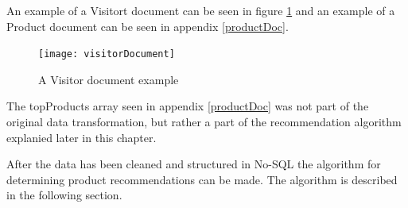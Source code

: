 An example of a Visitort document can be seen in figure \ref{visitorDoc} and an example of a Product document can be seen in appendix \ref{productDoc}.
\begin{figure}[H]
	\centering
	\texttt{[image: visitorDocument]}
	\caption{A Visitor document example}
	\label{visitorDoc}
\end{figure}

The topProducts array seen in appendix \ref{productDoc} was not part of the original data transformation, but rather a part of the recommendation algorithm explanied later in this chapter.

After the data has been cleaned and structured in No-SQL the algorithm for determining product recommendations can be made. The algorithm is described in the following section.